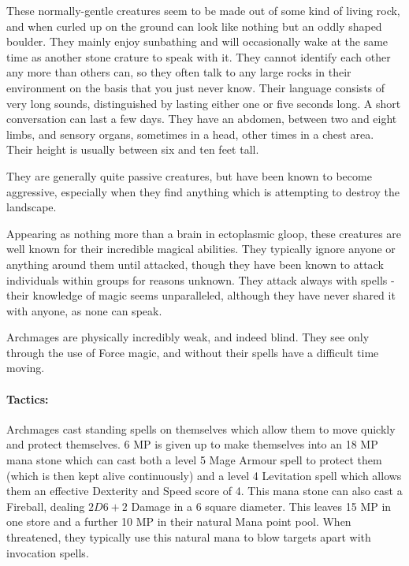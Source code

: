 \label{rockman}

\rockman

These normally-gentle creatures seem to be made out of some kind of living rock, and when curled up on the ground can look like nothing but an oddly shaped boulder.  They mainly enjoy sunbathing and will occasionally wake at the same time as another stone crature to speak with it.  They cannot identify each other any more than others can, so they often talk to any large rocks in their environment on the basis that you just never know.  Their language consists of very long sounds, distinguished by lasting either one or five seconds long.  A short conversation can last a few days.  They have an abdomen, between two and eight limbs, and sensory organs, sometimes in a head, other times in a chest area.  Their height is usually between six and ten feet tall.

They are generally quite passive creatures, but have been known to become aggressive, especially when they find anything which is attempting to destroy the landscape.

\label{archmage}

\archmage

Appearing as nothing more than a brain in ectoplasmic gloop, these creatures are well known for their incredible magical abilities.  They typically ignore anyone or anything around them until attacked, though they have been known to attack individuals within groups for reasons unknown.  They attack always with spells - their knowledge of magic seems unparalleled, although they have never shared it with anyone, as none can speak.

Archmages are physically incredibly weak, and indeed blind.  They see only through the use of Force magic, and without their spells have a difficult time moving.

\paragraph{Tactics:} Archmages cast standing spells on themselves which allow them to move quickly and protect themselves.  6 MP is given up to make themselves into an 18 MP mana stone which can cast both a level 5 Mage Armour spell to protect them (which is then kept alive continuously) and a level 4 Levitation spell which allows them an effective Dexterity and Speed score of 4.  This mana stone can also cast a Fireball, dealing $2D6+2$ Damage in a 6 square diameter.  This leaves 15 MP in one store and a further 10 MP in their natural Mana point pool.  When threatened, they typically use this natural mana to blow targets apart with invocation spells.

